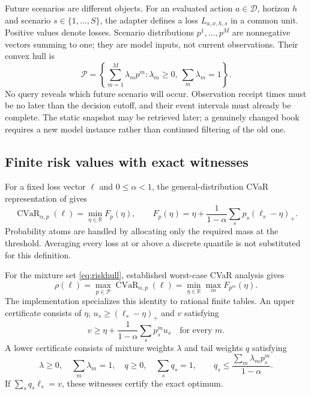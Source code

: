 \documentclass[11pt,a4paper]{article}
\theoremstyle{definition}\newtheorem{definition}[theorem]{Definition}
\newcommand{\R}{\mathbb{R}}
\begin{document}
Future scenarios are different objects. For an evaluated action $a\in\mathcal D$, horizon $h$ and scenario $s\in\{1,\ldots,S\}$, the adapter defines a loss $L_{a,x,h,s}$ in a common unit. Positive values denote losses. Scenario distributions $p^1,\ldots,p^M$ are nonnegative vectors summing to one; they are model inputs, not current observations. Their convex hull is
\begin{equation}
 \mathcal P=\left\{\sum_{m=1}^{M}\lambda_m p^m:\lambda_m\ge0,\ \sum_m\lambda_m=1\right\}.
 \label{eq:riskhull}
\end{equation}
No query reveals which future scenario will occur. Observation receipt times must be no later than the decision cutoff, and their event intervals must already be complete. The static snapshot may be retrieved later; a genuinely changed book requires a new model instance rather than continued filtering of the old one.

\subsection{Finite risk values with exact witnesses}
For a fixed loss vector $\ell$ and $0\le\alpha<1$, the general-distribution CVaR representation of \citet{rockafellar2002cvar} gives
\begin{equation}
 \operatorname{CVaR}_{\alpha,p}(\ell)
 =\min_{\eta\in\R}F_p(\eta),\qquad
 F_p(\eta)=\eta+\frac{1}{1-\alpha}\sum_s p_s(\ell_s-\eta)_+.
 \label{eq:cvarfinite}
\end{equation}
Probability atoms are handled by allocating only the required mass at the threshold. Averaging every loss at or above a discrete quantile is not substituted for this definition.

For the mixture set \eqref{eq:riskhull}, established worst-case CVaR analysis gives \cite{zhu2009wcvar}
\begin{equation}
 \rho(\ell)=\max_{p\in\mathcal P}\operatorname{CVaR}_{\alpha,p}(\ell)
 =\min_{\eta\in\R}\max_m F_{p^m}(\eta).
 \label{eq:robustcvar}
\end{equation}
The implementation specializes this identity to rational finite tables. An upper certificate consists of $\eta$, $u_s\ge(\ell_s-\eta)_+$ and $v$ satisfying
\begin{equation}
 v\ge\eta+\frac{1}{1-\alpha}\sum_s p^m_su_s\quad\text{for every }m.
 \label{eq:riskupper}
\end{equation}
A lower certificate consists of mixture weights $\lambda$ and tail weights $q$ satisfying
\begin{equation}
 \lambda\ge0,\quad\sum_m\lambda_m=1,\quad q\ge0,\quad\sum_s q_s=1,
 \qquad q_s\le\frac{\sum_m\lambda_mp^m_s}{1-\alpha}.
 \label{eq:risklower}
\end{equation}
If $\sum_s q_s\ell_s=v$, these witnesses certify the exact optimum.
\end{document}
